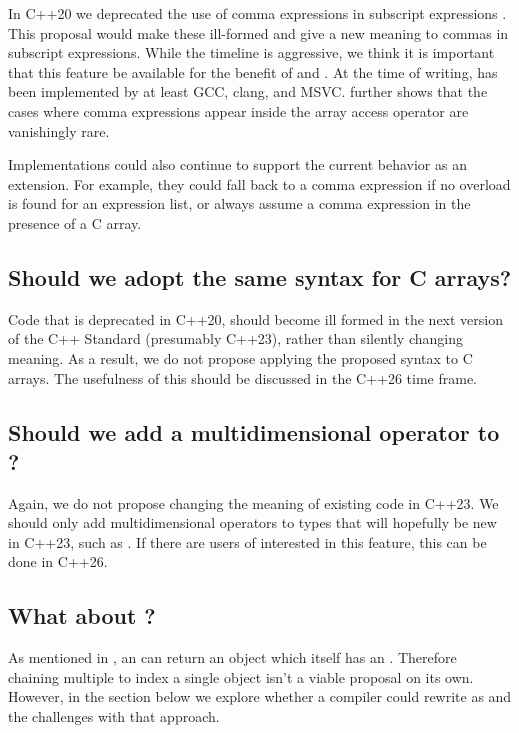 \documentclass{wg21}
\begin{document}
In C++20 we deprecated the use of comma expressions in subscript expressions .
This proposal would make these ill-formed and give a new meaning to commas in subscript expressions.
While the timeline is aggressive, we think it is important that this feature be available for the benefit of  and .
At the time of writing,  has been implemented by at least GCC, clang, and MSVC.
 further shows that the cases where comma expressions appear inside the array access operator are vanishingly rare.

Implementations could also continue to support the current behavior as an extension.  For example, they could fall back to a comma expression if no overload is found for an expression list, or always assume a comma expression in the presence of a C array.

\subsection{Should we adopt the same syntax for C arrays?}

Code that is deprecated in C++20, should become ill formed in the next version of the C++ Standard (presumably C++23),
rather than silently changing meaning.
As a result, we do not propose applying the proposed syntax to C arrays.
The usefulness of this should be discussed in the C++26 time frame.

\subsection{Should we add a multidimensional operator to ?}

Again, we do not propose changing the meaning of existing code in C++23.
We should only add multidimensional operators to types that will hopefully be new in C++23, such as .
If there are users of  interested in this feature, this can be done in C++26.

\subsection{What about \tcode{[foo][bar]}?}

As mentioned in , an  can return an object which itself has an .
Therefore chaining multiple \tcode{[]} to index a single object isn't a viable proposal on its own.
However, in the section below we explore whether a compiler could rewrite  as 
and the challenges with that approach.
\end{document}
